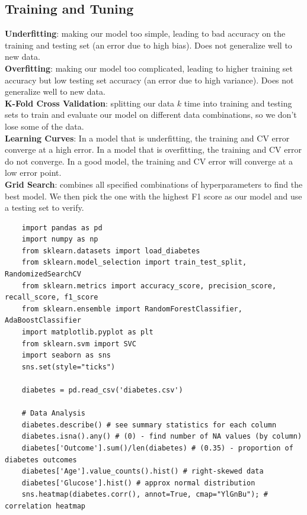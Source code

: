 \documentclass[11pt, a4paper]{article}
\begin{document}
\begin{spacing}{1.1}
	\subsection{Training and Tuning}
	\textbf{Underfitting}: making our model too simple, leading to bad accuracy on the training and testing set (an error due to high bias). Does not generalize well to new data. \vspace*{2mm}\\
	\textbf{Overfitting}: making our model too complicated, leading to higher training set accuracy but low testing set accuracy (an error due to high variance). Does not generalize well to new data. \vspace*{2mm}\\
	\textbf{K-Fold Cross Validation}: splitting our data $k$ time into training and testing sets to train and evaluate our model on different data combinations, so we don't lose some of the data. \vspace*{2mm}\\
	\textbf{Learning Curves}: In a model that is underfitting, the training and CV error converge at a high error. In a model that is overfitting, the training and CV error do not converge. In a good model, the training and CV error will converge at a low error point. \vspace*{2mm}\\
	\textbf{Grid Search}: combines all specified combinations of hyperparameters to find the best model. We then pick the one with the highest F1 score as our model and use a testing set to verify.
	\begin{lstlisting}
	import pandas as pd
	import numpy as np
	from sklearn.datasets import load_diabetes
	from sklearn.model_selection import train_test_split, RandomizedSearchCV
	from sklearn.metrics import accuracy_score, precision_score, recall_score, f1_score
	from sklearn.ensemble import RandomForestClassifier, AdaBoostClassifier
	import matplotlib.pyplot as plt
	from sklearn.svm import SVC
	import seaborn as sns
	sns.set(style="ticks")
	
	diabetes = pd.read_csv('diabetes.csv')
	
	# Data Analysis
	diabetes.describe() # see summary statistics for each column
	diabetes.isna().any() # (0) - find number of NA values (by column) 
	diabetes['Outcome'].sum()/len(diabetes) # (0.35) - proportion of diabetes outcomes
	diabetes['Age'].value_counts().hist() # right-skewed data
	diabetes['Glucose'].hist() # approx normal distribution
	sns.heatmap(diabetes.corr(), annot=True, cmap="YlGnBu"); # correlation heatmap
	

\end{lstlisting}
\end{spacing}
\end{document}
